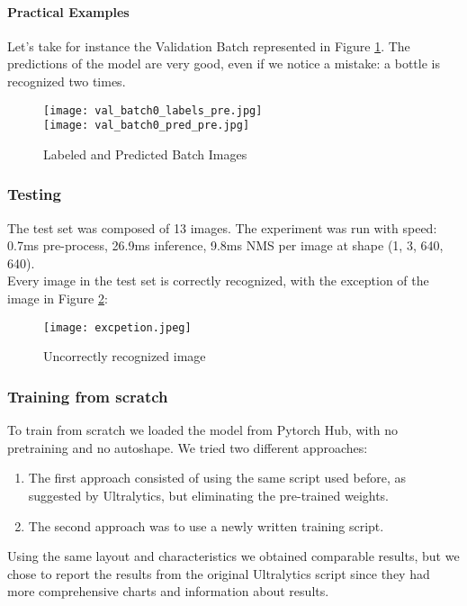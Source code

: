 \newpage
\paragraph{Practical Examples}
Let's take for instance the Validation Batch represented in Figure \ref{fig:in1}. The predictions of the model are very good, even if we notice a mistake: a bottle is recognized two times. 
\begin{figure}[h!]
  \centering
  \texttt{[image: val\_batch0\_labels\_pre.jpg]}\\
  \texttt{[image: val\_batch0\_pred\_pre.jpg]}
  \caption{Labeled and Predicted Batch Images}
  \label{fig:in1}
\end{figure}

\newpage
\subsubsection{Testing}
The test set was composed of 13 images. The experiment was run with speed: 0.7ms pre-process, 26.9ms inference, 9.8ms NMS per image at shape (1, 3, 640, 640).\\
Every image in the test set is correctly recognized, with the exception of the image in Figure \ref{fig:ex1}:

\begin{figure}[h!]
  \centering
  \texttt{[image: excpetion.jpeg]}
  \caption{Uncorrectly recognized image}
  \label{fig:ex1}
\end{figure}

\subsubsection{Training from scratch}
To train from scratch we loaded the model from Pytorch Hub, with no pretraining and no autoshape. We tried two different approaches:
\begin{enumerate}
    \item The first approach consisted of using the same script used before, as suggested by Ultralytics, but eliminating the pre-trained weights.
    \item The second approach was to use a newly written training script.
\end{enumerate}
Using the same layout and characteristics we obtained comparable results, but we chose to report the results from the original Ultralytics script since they had more comprehensive charts and information about results.\\

